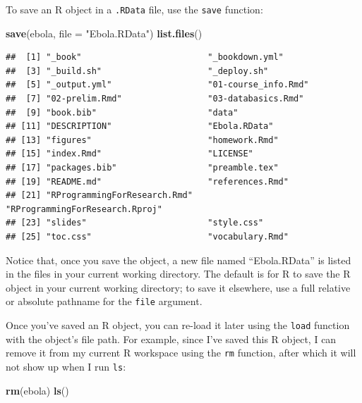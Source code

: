 \documentclass[]{book}
\makeatletter
\newenvironment{Shaded}{\begin{snugshade}}{\end{snugshade}}
\newcommand{\KeywordTok}[1]{\textcolor[rgb]{0.13,0.29,0.53}{\textbf{{#1}}}}
\newcommand{\DataTypeTok}[1]{\textcolor[rgb]{0.13,0.29,0.53}{{#1}}}
\newcommand{\StringTok}[1]{\textcolor[rgb]{0.31,0.60,0.02}{{#1}}}
\newcommand{\NormalTok}[1]{{#1}}
\newenvironment{kframe}{%
\medskip{}
\setlength{\fboxsep}{.8em}
 \def\at@end@of@kframe{}%
 \ifinner\ifhmode%
  \def\at@end@of@kframe{\end{minipage}}%
  \begin{minipage}{\columnwidth}%
 \fi\fi%
 \def\FrameCommand##1{\hskip\@totalleftmargin \hskip-\fboxsep
 \colorbox{shadecolor}{##1}\hskip-\fboxsep
     \hskip-\linewidth \hskip-\@totalleftmargin \hskip\columnwidth}%
 \MakeFramed {\advance\hsize-\width
   \@totalleftmargin\z@ \linewidth\hsize
   \@setminipage}}%
 {\par\unskip\endMakeFramed%
 \at@end@of@kframe}
\renewenvironment{Shaded}{\begin{kframe}}{\end{kframe}}
\makeatother
\begin{document}
To save an R object in a \texttt{.RData} file, use the \texttt{save}
function:

\begin{Shaded}
\begin{Highlighting}[]
\KeywordTok{save}\NormalTok{(ebola, }\DataTypeTok{file =} \StringTok{"Ebola.RData"}\NormalTok{)}
\KeywordTok{list.files}\NormalTok{()}
\end{Highlighting}
\end{Shaded}

\begin{verbatim}
##  [1] "_book"                         "_bookdown.yml"                
##  [3] "_build.sh"                     "_deploy.sh"                   
##  [5] "_output.yml"                   "01-course_info.Rmd"           
##  [7] "02-prelim.Rmd"                 "03-databasics.Rmd"            
##  [9] "book.bib"                      "data"                         
## [11] "DESCRIPTION"                   "Ebola.RData"                  
## [13] "figures"                       "homework.Rmd"                 
## [15] "index.Rmd"                     "LICENSE"                      
## [17] "packages.bib"                  "preamble.tex"                 
## [19] "README.md"                     "references.Rmd"               
## [21] "RProgrammingForResearch.Rmd"   "RProgrammingForResearch.Rproj"
## [23] "slides"                        "style.css"                    
## [25] "toc.css"                       "vocabulary.Rmd"
\end{verbatim}

Notice that, once you save the object, a new file named ``Ebola.RData''
is listed in the files in your current working directory. The default is
for R to save the R object in your current working directory; to save it
elsewhere, use a full relative or absolute pathname for the
\texttt{file} argument.

Once you've saved an R object, you can re-load it later using the
\texttt{load} function with the object's file path. For example, since
I've saved this R object, I can remove it from my current R workspace
using the \texttt{rm} function, after which it will not show up when I
run \texttt{ls}:

\begin{Shaded}
\begin{Highlighting}[]
\KeywordTok{rm}\NormalTok{(ebola)}
\KeywordTok{ls}\NormalTok{()}
\end{Highlighting}
\end{Shaded}
\end{document}
